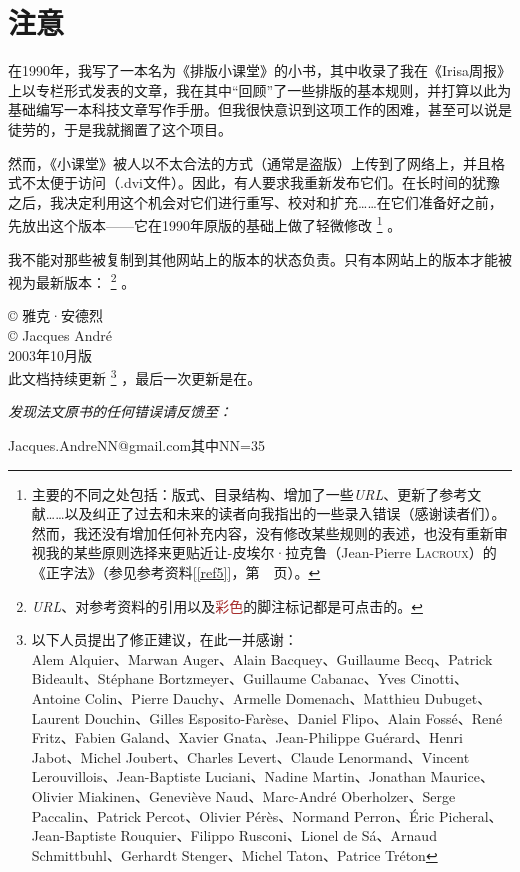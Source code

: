 \chapter*{注意}

在1990年，我写了一本名为《排版小课堂》的小书，其中收录了我在《Irisa周报》上以专栏形式发表的文章，我在其中``回顾''了一些排版的基本规则，并打算以此为基础编写一本科技文章写作手册。但我很快意识到这项工作的困难，甚至可以说是徒劳的，于是我就搁置了这个项目。

然而，《小课堂》被人以不太合法的方式（通常是盗版）上传到了网络上，并且格式不太便于访问（.dvi文件）。因此，有人要求我重新发布它们。在长时间的犹豫之后，我决定利用这个机会对它们进行重写、校对和扩充……在它们准备好之前，先放出这个版本——它在1990年原版的基础上做了轻微修改
    \footnote{主要的不同之处包括：版式、目录结构、增加了一些\emph{URL}、更新了参考文献……以及纠正了过去和未来的读者向我指出的一些录入错误（感谢读者们）。然而，我还没有增加任何补充内容，没有修改某些规则的表述，也没有重新审视我的某些原则选择来更贴近让-皮埃尔·拉克鲁（Jean-Pierre \textsc{Lacroux}）的《正字法》（参见参考资料[\ref{ref5}]，第~\pageref{ref5}~页）。%
    }
。

我不能对那些被复制到其他网站上的版本的状态负责。只有本网站上的版本才能被视为最新版本：
    \footnote{\emph{URL}、对参考资料的引用以及\textcolor{brown}{彩色}的脚注标记都是可点击的。}
。\label{aver}

\begin{flushright}
© 雅克·安德烈\\
© Jacques André\\
2003年10月版\\
此文档持续更新
    \footnote{以下人员提出了修正建议，在此一并感谢：\\
    Alem Alquier、Marwan Auger、Alain Bacquey、Guillaume Becq、Patrick Bideault、Stéphane Bortzmeyer、Guillaume Cabanac、Yves Cinotti、Antoine Colin、Pierre Dauchy、Armelle Domenach、Matthieu Dubuget、Laurent Douchin、Gilles Esposito-Farèse、Daniel Flipo、Alain Fossé、René Fritz、Fabien Galand、Xavier Gnata、Jean-Philippe Guérard、Henri Jabot、Michel Joubert、Charles Levert、Claude Lenormand、Vincent Lerouvillois、Jean-Baptiste Luciani、Nadine Martin、Jonathan Maurice、Olivier Miakinen、Geneviève Naud、Marc-André Oberholzer、Serge Paccalin、Patrick Percot、Olivier Pérès、Normand Perron、Éric Picheral、Jean-Baptiste Rouquier、Filippo Rusconi、Lionel de Sá、Arnaud Schmittbuhl、Gerhardt Stenger、Michel Taton、Patrice Tréton
    }
，最后一次更新是在\origindate。
\end{flushright}

\vfill
\begin{center}
    \emph{发现法文原书的任何错误请反馈至：
    }

    Jacques.AndreNN@gmail.com\qquad 其中NN=35
\end{center}

